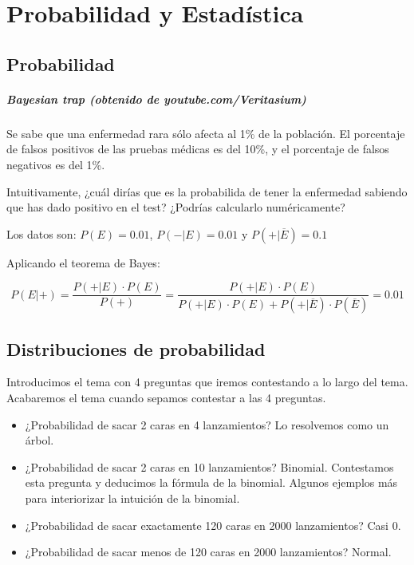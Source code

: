 \chapter{Probabilidad y Estadística}

\section{Probabilidad}


\paragraph{Bayesian trap (obtenido de youtube.com/Veritasium)}

\begin{example}
Se sabe que una enfermedad rara sólo afecta al 1\% de la población. 
%
El porcentaje de falsos positivos de las pruebas médicas es del 10\%, y el porcentaje de falsos negativos es del 1\%.

Intuitivamente, ¿cuál dirías que es la probabilida de tener la enfermedad sabiendo que has dado positivo en el test? ¿Podrías calcularlo numéricamente?

Los datos son: $P(E) = 0.01$, $P(-|E) = 0.01$ y $P(+|\overline{E})=0.1$

Aplicando el teorema de Bayes:

\[P(E|+) = \frac{P(+|E)·P(E)}{P(+)} = \frac{P(+|E)·P(E)}{P(+|E)·P(E) + P(+|\overline{E})·P(\overline{E})}= 0.01 \]
\end{example}

\section{Distribuciones de probabilidad}

Introducimos el tema con 4 preguntas que iremos contestando a lo largo del tema. Acabaremos el tema cuando sepamos contestar a las 4 preguntas.

\begin{itemize}
    \item ¿Probabilidad de sacar 2 caras en 4 lanzamientos? Lo resolvemos como un árbol.
    \item ¿Probabilidad de sacar 2 caras en 10 lanzamientos? Binomial. Contestamos esta pregunta y deducimos la fórmula de la binomial. Algunos ejemplos más para interiorizar la intuición de la binomial.
    \item ¿Probabilidad de sacar exactamente 120 caras en 2000 lanzamientos? Casi 0.
    \item ¿Probabilidad de sacar menos de 120 caras en 2000 lanzamientos? Normal.
\end{itemize}


